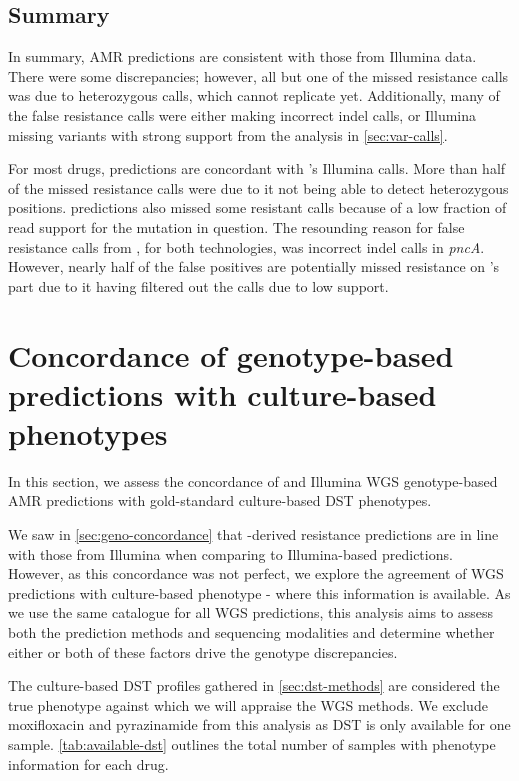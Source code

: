 \subsection{Summary}

In summary, \mykrobe{} \ont{} AMR predictions are consistent with those from Illumina data. There were some discrepancies; however, all but one of the missed resistance calls was due to heterozygous calls, which \ont{} cannot replicate yet. Additionally, many of the false resistance calls were either \ont{} making incorrect indel calls, or Illumina missing variants with strong support from the analysis in \autoref{sec:var-calls}.

For most drugs, \drprg{} predictions are concordant with \mykrobe{}'s Illumina calls. More than half of the \drprg{} missed resistance calls were due to it not being able to detect heterozygous positions. \drprg{} \ont{} predictions also missed some resistant calls because of a low fraction of read support for the mutation in question. The resounding reason for false resistance calls from \drprg{}, for both technologies, was incorrect indel calls in \textit{pncA}. However, nearly half of the \drprg{} false positives are potentially missed resistance on \mykrobe{}'s part due to it having filtered out the calls due to low support. 

\section{Concordance of genotype-based predictions with culture-based phenotypes}
\label{sec:pheno-concordance}

In this section, we assess the concordance of \ont{} and Illumina WGS genotype-based AMR predictions with gold-standard culture-based DST phenotypes.

We saw in \autoref{sec:geno-concordance} that \ont{}-derived resistance predictions are in line with those from Illumina when comparing to \mykrobe{} Illumina-based predictions. However, as this concordance was not perfect, we explore the agreement of WGS predictions with culture-based phenotype - where this information is available. As we use the same catalogue for all WGS predictions, this analysis aims to assess both the prediction methods and sequencing modalities and determine whether either or both of these factors drive the genotype discrepancies.

The culture-based DST profiles gathered in \autoref{sec:dst-methods} are considered the true phenotype against which we will appraise the WGS methods. We exclude moxifloxacin and pyrazinamide from this analysis as DST is only available for one sample. \autoref{tab:available-dst} outlines the total number of samples with phenotype information for each drug.

